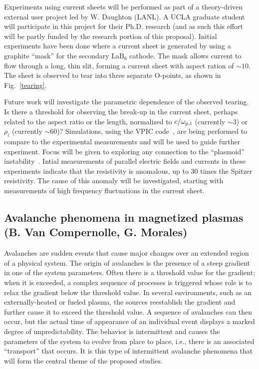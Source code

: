 \documentclass[11pt]{article}
\renewcommand{\cite}{\citep}
\begin{document}
 
Experiments using current sheets will be performed as part of a
theory-driven external user project led by W. Daughton (LANL).  A UCLA
graduate student will participate in this project for their
Ph.D. research (and as such this effort will be partly funded by the research
portion of this proposal).   Initial experiments have been done where
a current sheet is generated by using a graphite ``mask'' for the
secondary LaB$_6$ cathode.  The mask allows current to flow through a
long, thin slit, forming a current sheet with aspect ration of $\sim
10$. The sheet is observed to tear into three separate O-points, as
shown in Fig.~\ref{tearing}.


Future work will investigate the parametric dependence of the observed
tearing.  Is there a threshold for observing the break-up in the
current sheet, perhaps related to the aspect ratio or the length,
normalized to $c/\omega_{\rm p,i}$ (currently $\sim 3$) or $\rho_i$
(currently $\sim 60$)?  Simulations, using the VPIC code~\cite{bowers:2009}, are being
performed to compare to the experimental measurements and will be used
to guide further experiment. Focus will be given to exploring any
connection to the ``plasmoid''
instability~\cite{loureiro:2007,daughton:2009}.   Intial measurements
of parallel electric fields and currents in these experiments indicate
that the resistivity is anomalous, up to 30 times the Spitzer
resistivity.  The cause of this anomaly will be investigated, starting
with measurements of high frequency fluctuations in the current sheet.    



\subsection{Avalanche phenomena in magnetized plasmas (B. Van Compernolle, G.
Morales)}

Avalanches are sudden events that cause major changes over an extended
region of a physical system. The origin of avalanches is the presence of
a steep gradient in one of the system parameters. Often there is a
threshold value for the gradient; when it is exceeded, a complex
sequence of processes is triggered whose role is to relax the gradient
below the threshold value. In several environments, such as an
externally-heated or fueled plasma, the sources reestablish the gradient
and further cause it to exceed the threshold value. A sequence of
avalanches can then occur, but the actual time of appearance of an
individual event displays a marked degree of unpredictability. The
behavior is intermittent and causes the parameters of the system to
evolve from place to place, i.e., there is an associated ``transport''
that occurs. It is this type of intermittent avalanche phenomena that
will form the central theme of the proposed studies.
\end{document}
